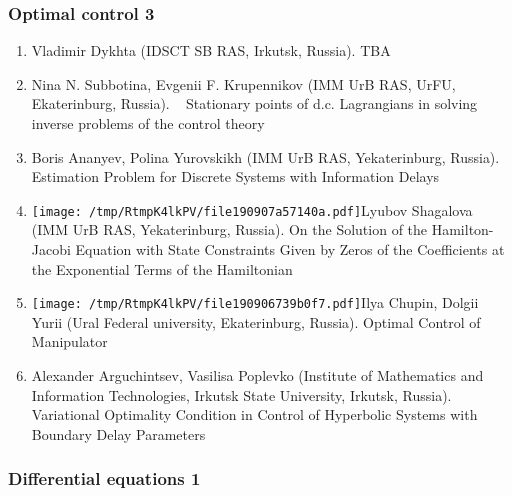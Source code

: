 \documentclass[
]{article}
\providecommand{\tightlist}{%
  \setlength{\itemsep}{0pt}\setlength{\parskip}{0pt}}
\begin{document}
\hypertarget{oc3}{%
\subsubsection{Optimal control 3}\label{oc3}}

\begin{enumerate}
\def\labelenumi{\arabic{enumi}.}
\tightlist
\item
  Vladimir Dykhta (IDSCT SB RAS, Irkutsk, Russia). TBA
\item
  Nina N. Subbotina, Evgenii F. Krupennikov (IMM UrB RAS, UrFU,
  Ekaterinburg, Russia). ~ Stationary points of d.c. Lagrangians in
  solving inverse problems of the control theory
\item
  Boris Ananyev, Polina Yurovskikh (IMM UrB RAS, Yekaterinburg, Russia).
  Estimation Problem for Discrete Systems with Information Delays
\item
  \protect\texttt{[image: /tmp/RtmpK4lkPV/file190907a57140a.pdf]}Lyubov
  Shagalova (IMM UrB RAS, Yekaterinburg, Russia). On the Solution of the
  Hamilton-Jacobi Equation with State Constraints Given by Zeros of the
  Coefficients at the Exponential Terms of the Hamiltonian
\item
  \protect\texttt{[image: /tmp/RtmpK4lkPV/file190906739b0f7.pdf]}Ilya
  Chupin, Dolgii Yurii (Ural Federal university, Ekaterinburg, Russia).
  Optimal Control of Manipulator
\item
  Alexander Arguchintsev, Vasilisa Poplevko (Institute of Mathematics
  and Information Technologies, Irkutsk State University, Irkutsk,
  Russia). Variational Optimality Condition in Control of Hyperbolic
  Systems with Boundary Delay Parameters
\end{enumerate}

\hypertarget{de1}{%
\subsubsection{Differential equations 1}\label{de1}}
\end{document}
